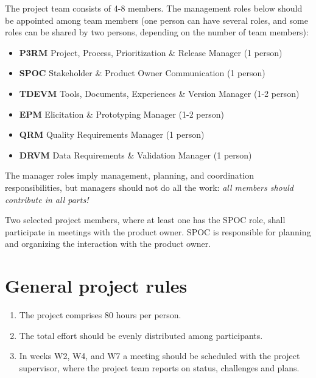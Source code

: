 The project team consists of 4-8 members. The management roles below should be appointed among team members (one person can have several roles, and some roles can be shared by two persons, depending on the number of team members):

\begin{itemize}[noitemsep]
\item \textbf{P3RM} Project, Process, Prioritization \& Release Manager (1 person)
\item \textbf{SPOC} Stakeholder \& Product Owner Communication (1 person)
\item \textbf{TDEVM} Tools, Documents, Experiences \& Version Manager (1-2 person)
\item \textbf{EPM} Elicitation \& Prototyping Manager (1-2 person)
\item \textbf{QRM} Quality Requirements Manager (1 person)
\item \textbf{DRVM} Data Requirements \& Validation Manager (1 person)
\end{itemize}

\noindent The manager roles imply management, planning, and coordination responsibilities, but managers should not do all the work: {\it all members should contribute in all parts!}

Two selected project members, where at least one has the SPOC role, shall participate in meetings with the product owner. SPOC is responsible for planning and organizing the interaction with the product owner.

\section{General project rules}
\begin{enumerate}[nolistsep]
\item The project comprises 80 hours per person.
\item The total effort should be evenly distributed among participants.
\item In weeks W2, W4, and W7 a meeting should be scheduled with the project supervisor, where the project team reports on status, challenges and plans.
\end{enumerate}

\newcommand{\ITERATIONTHREE}{
 Iteration 3 & Conference Presentation & Week 7: Wednesday 08:00\\
      & Discussant Questions & Week 7: Wednesday 15:00\\
      & Release R3 & Week 7: Sunday 23:59\\
}


